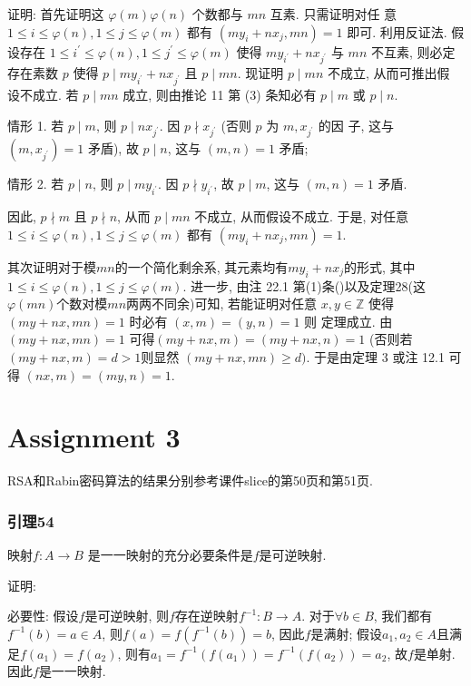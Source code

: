 \documentclass[a4paper,12pt]{ctexart}
\begin{document}
  证明: 首先证明这 $\varphi(m) \varphi(n)$ 个数都与 $m n$ 互素. 只需证明对任 意 $1 \leq i \leq \varphi(n), 1 \leq j \leq \varphi(m)$ 都有 $\left(m y_i+n x_j, m n\right)=1$ 即可. 利用反证法. 假设存在 $1 \leq i^{\prime} \leq \varphi(n), 1 \leq j^{\prime} \leq \varphi(m)$ 使得 $m y_{i^{\prime}}+n x_{j^{\prime}}$ 与 $m n$ 不互素, 则必定存在素数 $p$ 使得 $p \mid m y_{i^{\prime}}+n x_{j^{\prime}}$ 且 $p \mid m n$. 现证明 $p \mid m n$ 不成立, 从而可推出假 设不成立. 若 $p \mid m n$ 成立, 则由推论 11 第 (3) 条知必有 $p \mid m$ 或 $p \mid n$. 

  情形 1. 若 $p \mid m$, 则 $p \mid n x_{j^{\prime}}$. 因 $p \nmid x_{j^{\prime}}$ (否则 $p$ 为 $m, x_{j^{\prime}}$ 的因 子, 这与 $\left(m, x_{j^{\prime}}\right)=1$ 矛盾), 故 $p \mid n$, 这与 $(m, n)=1$ 矛盾;

  情形 2. 若 $p \mid n$, 则 $p \mid m y_{i^{\prime}}$. 因 $p \nmid y_{i^{\prime}}$, 故 $p \mid m$, 这与 $(m, n)=1$ 矛盾.

  因此, $p \nmid m$ 且 $p \nmid n$, 从而 $p \mid m n$ 不成立, 从而假设不成立. 于是, 对任意 $1 \leq i \leq \varphi(n), 1 \leq j \leq \varphi(m)$ 都有 $\left(m y_i+n x_j, m n\right)=1$. 

  其次证明对于模$mn$的一个简化剩余系, 其元素均有$my_i+nx_j$的形式, 其中$1\le i\le \varphi(n),1\le j\le\varphi(m)$.
  进一步, 由注 22.1 第(1)条()以及定理28(这$\varphi(mn)$个数对模$mn$两两不同余)可知, 若能证明对任意 $x, y \in \mathbb{Z}$ 使得 $(m y+n x, m n)=1$ 时必有 $(x, m)=(y, n)=1$ 则 定理成立. 由 $(m y+n x, m n)=1$ 可得$(m y+n x, m)=(m y+n x, n)=1$ (否则若$(m y+n x, m)=d>1$则显然 $(m y+n x, m n) \geq d)$. 于是由定理 3 或注 12.1 可得 $(n x, m)=(m y, n)=1$.


\section*{Assignment 3}

    RSA和Rabin密码算法的结果分别参考课件slice的第50页和第51页.

\subsubsection*{引理54}
    映射$f:A\rightarrow B$ 是一一映射的充分必要条件是$f$是可逆映射.

    证明:  
    
    必要性: 假设$f$是可逆映射, 则$f$存在逆映射$f^{-1}:B\rightarrow A$. 对于$\forall b\in B$, 我们都有$f^{-1}(b)=a\in A$, 则$f(a)=f(f^{-1}(b))=b$, 因此$f$是满射; 假设$a_1,a_2\in A$且满足$f(a_1)=f(a_2)$, 则有$a_1=f^{-1}(f(a_1))=f^{-1}(f(a_2))=a_2$, 故$f$是单射. 因此$f$是一一映射.
\end{document}
